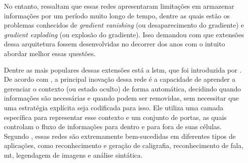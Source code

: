 
No entanto,  ressaltam que essas redes apresentaram limitações em armazenar informações por um período muito longo de tempo, dentre as quais estão os problemas conhecidos de \textit{gradient vanishing} (ou desaparecimento do gradiente) e \textit{gradient exploding} (ou explosão do gradiente). Isso demandou com que extensões dessa arquitetura fossem desenvolvidas no decorrer dos anos com o intuito abordar melhor essas questões.


Dentre as mais populares dessas extensões está a \acrshort{lstm}, que foi introduzida por . De acordo com , a principal inovação dessa rede é a capacidade de aprender a gerenciar o contexto (ou estado oculto) de forma automática, decidindo quando informações são necessárias e quando podem ser removidas, sem necessitar que uma estratégia explícita seja codificada para isso. Ele utiliza uma camada específica para representar esse contexto e um conjunto de portas, as quais controlam o fluxo de informações para dentro e para fora de suas células.
Segundo , essas redes são extremamente bem-sucedidas em diferentes tipos de aplicações, como reconhecimento e geração de caligrafia, reconhecimento de fala, \acrfull{mt}, legendagem de imagens e análise sintática.

